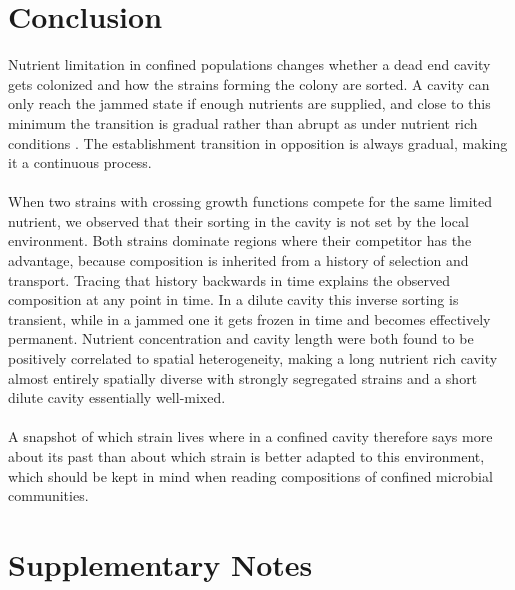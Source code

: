 \documentclass[11pt,a4paper]{report}
\begin{document}
	\chapter{Conclusion}
	Nutrient limitation in confined populations changes whether a dead end cavity gets colonized and how the strains forming the colony are sorted. A cavity can only reach the jammed state if enough nutrients are supplied, and close to this minimum the transition is gradual rather than abrupt as under nutrient rich conditions \cite{Karita}. The establishment transition in opposition is always gradual, making it a continuous process. \\
	\\When two strains with crossing growth functions compete for the same limited nutrient, we observed that their sorting in the cavity is not set by the local environment. Both strains dominate regions where their competitor has the advantage, because composition is inherited from a history of selection and transport. Tracing that history backwards in time explains the observed composition at any point in time. In a dilute cavity this inverse sorting is transient, while in a jammed one it gets frozen in time and becomes effectively permanent. Nutrient concentration and cavity length were both found to be positively correlated to spatial heterogeneity, making a long nutrient rich cavity almost entirely spatially diverse with strongly segregated strains and a short dilute cavity essentially well-mixed.\\
	\\ A snapshot of which strain lives where in a confined cavity therefore says more about its past than about which strain is better adapted to this environment, which should be kept in mind when reading compositions of confined microbial communities.
	\printbibliography

	\appendix
	\chapter{Supplementary Notes}
\end{document}
